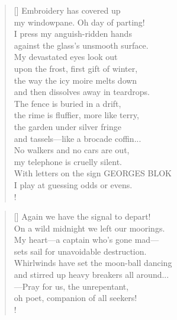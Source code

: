 \documentclass[]{article}
\begin{document}
\settowidth{\versewidth}{my windowpane. Oh day of parting!}
\begin{verse}[\versewidth]
Embroidery has covered up\\
my windowpane. Oh day of parting!\\
I press my anguish-ridden hands\\
against the glass's unsmooth surface.\\
My devastated eyes look out\\
upon the frost, first gift of winter,\\
the way the icy moire melts down\\
and then dissolves away in teardrops.\\
The fence is buried in a drift,\\
the rime is fluffier, more like terry,\\
the garden under silver fringe\\
and tassels—like a brocade coffin...\\
No walkers and no cars are out,\\
my telephone is cruelly silent.\\
With letters on the sign GEORGES BLOK\\
I play at guessing odds or evens.\\!
\end{verse}
\bigskip \bigskip 

\settowidth{\versewidth}{Again we have the signal to depart!  }
\begin{verse}[\versewidth]
Again we have the signal to depart!\\
On a wild midnight we left our moorings.\\
My heart—a captain who's gone mad—\\
sets sail for unavoidable destruction.\\
Whirlwinds have set the moon-ball dancing\\
and stirred up heavy breakers all around... \\
—Pray for us, the unrepentant,\\
oh poet, companion of all seekers!\\! 
\end{verse}
\newpage
\end{document}
